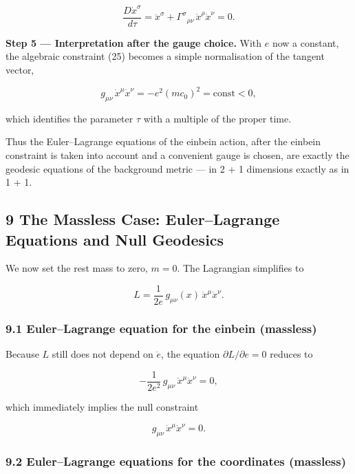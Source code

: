 \documentclass[
]{article}
\begin{document}
\[\frac{D \dot{x}^{\sigma}}{d\tau} = \ddot{x}^{\sigma} + \Gamma^{\sigma}{}_{\rho\nu}\, \dot{x}^{\rho} \dot{x}^{\nu} = 0. \tag{60}\]

\textbf{Step 5 --- Interpretation after the gauge choice.} With \(e\)
now a constant, the algebraic constraint (25) becomes a simple
normalisation of the tangent vector,

\[g_{\mu\nu}\, \dot{x}^{\mu} \dot{x}^{\nu} = - e^{2} (mc_{0})^{2} = \mathrm{const} < 0, \tag{61}\]

which identifies the parameter \(\tau\) with a multiple of the proper
time.

Thus the Euler--Lagrange equations of the einbein action, after the
einbein constraint is taken into account and a convenient gauge is
chosen, are exactly the geodesic equations of the background metric ---
in 2 + 1 dimensions exactly as in 1 + 1.

\hypertarget{the-massless-case-eulerlagrange-equations-and-null-geodesics}{%
\subsection{9 The Massless Case: Euler--Lagrange Equations and Null
Geodesics}\label{the-massless-case-eulerlagrange-equations-and-null-geodesics}}

We now set the rest mass to zero, \(m = 0\). The Lagrangian simplifies
to

\[L = \frac{1}{2e}\, g_{\mu\nu}(x)\, \dot{x}^{\mu} \dot{x}^{\nu}. \tag{62}\]

\hypertarget{eulerlagrange-equation-for-the-einbein-massless}{%
\subsubsection{9.1 Euler--Lagrange equation for the einbein
(massless)}\label{eulerlagrange-equation-for-the-einbein-massless}}

Because \(L\) still does not depend on \(\dot{e}\), the equation
\(\partial L / \partial e = 0\) reduces to

\[- \frac{1}{2e^{2}}\, g_{\mu\nu}\, \dot{x}^{\mu} \dot{x}^{\nu} = 0, \tag{63}\]

which immediately implies the null constraint

\[g_{\mu\nu}\, \dot{x}^{\mu} \dot{x}^{\nu} = 0. \tag{64}\]

\hypertarget{eulerlagrange-equations-for-the-coordinates-massless}{%
\subsubsection{9.2 Euler--Lagrange equations for the coordinates
(massless)}\label{eulerlagrange-equations-for-the-coordinates-massless}}
\end{document}
